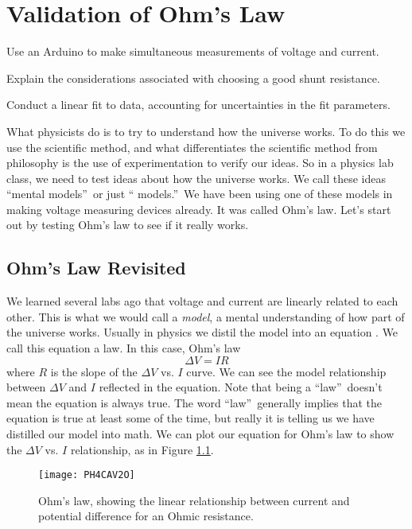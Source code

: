 \chapter{Validation of Ohm's Law}

\objectives
{
\item Use an Arduino to make simultaneous measurements of voltage and 
	current.
\item Explain the considerations associated with choosing a good shunt
	resistance.
\item Conduct a linear fit to data, accounting for uncertainties in the fit 
	parameters.
}

What physicists do is to try to understand how the universe works. To do
this we use the scientific method, and what differentiates the scientific method
from philosophy is the use of experimentation to verify our ideas.
So in a physics lab class, we need to test ideas about how the universe
works. We call these ideas \textquotedblleft mental
models\textquotedblright\ or just \textquotedblleft
models.\textquotedblright\ We have been using one of these models in making
voltage measuring devices already. It was called Ohm's law. Let's start out
by testing Ohm's law to see if it really works.

\section{Ohm's Law Revisited}

We learned several labs ago that voltage and current are linearly related to
each other. This is what we would call a \emph{model}, a mental
understanding of how part of the universe works. Usually in physics we
distil the model into an equation . We call this equation a law. In this
case, Ohm's law
\begin{equation*}
\Delta V=IR
\end{equation*}%
where $R$ is the slope of the $\Delta V$ vs. $I$ curve. We can see the model
relationship between $\Delta V$ and $I$ reflected in the equation. Note that
being a \textquotedblleft law\textquotedblright\ doesn't mean the equation
is always true. The word \textquotedblleft law\textquotedblright\ generally
implies that the equation is true at least some of the time, but really it
is telling us we have distilled our model into math.
We can plot our equation for Ohm's law 
to show the $\Delta V$ vs. $I$ relationship, as in Figure \ref{fig:ohm}.
\begin{figure}[htbp!]
\centering
\texttt{[image: PH4CAV2O]}
	\caption[Ohm's law]{Ohm's law, showing the linear relationship between
	current and potential difference for an Ohmic resistance.}
	\label{fig:ohm}
\end{figure}

